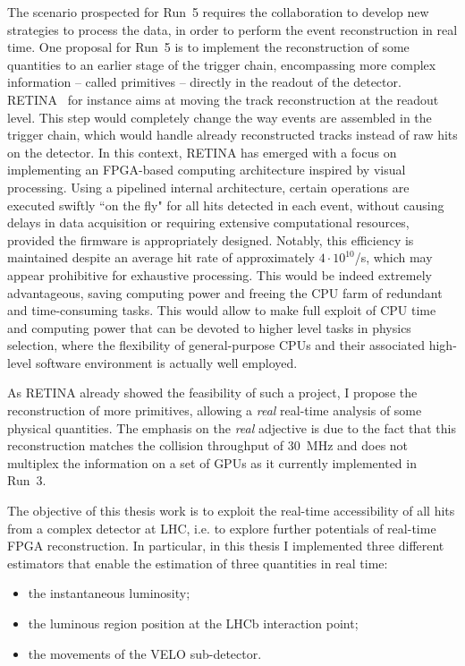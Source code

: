 The scenario prospected for Run~5 requires the collaboration to develop new strategies to process the data, in order to perform the event reconstruction in real time. One proposal for Run~5 is to implement the reconstruction of some quantities to an earlier stage of the trigger chain, encompassing  more complex information -- called primitives -- directly in the readout of the detector. RETINA~\cite{refId0} for instance aims at moving the track reconstruction at the readout level. This step would completely change the way events are assembled in the trigger chain, which would handle already reconstructed tracks instead of raw hits on the detector. In this context, RETINA has emerged with a focus on implementing an FPGA-based computing architecture inspired by visual processing. Using a pipelined internal architecture, certain operations are executed swiftly ``on the fly" for all hits detected in each event, without causing delays in data acquisition or requiring extensive computational resources, provided the firmware is appropriately designed. Notably, this efficiency is maintained despite an average hit rate of approximately $4 \cdot 10^{10}$/s, which may appear prohibitive for exhaustive processing.
This would be indeed extremely advantageous, saving computing power and freeing the CPU farm of redundant and time-consuming tasks. This would allow to make full exploit of CPU time and computing power that can be devoted to higher level tasks in physics selection, where the flexibility of general-purpose CPUs and their associated high-level software environment is actually well employed.

As RETINA already showed the feasibility of such a project, I propose the reconstruction of more primitives, allowing a \textit{real} real-time analysis of some physical quantities. The emphasis on the \textit{real} adjective is due to the fact that this reconstruction matches the collision throughput of \SI{30}{\mega\hertz} and does not multiplex the information on a set of GPUs as it currently implemented in Run~3.

The objective of this thesis work is to exploit the real-time accessibility of all hits from a complex detector at LHC, i.e. to explore further potentials of real-time FPGA reconstruction. In particular, in this thesis I implemented three different estimators that enable the estimation of three quantities in real time:
\begin{itemize}
\item the instantaneous luminosity;
\item the luminous region position at the LHCb interaction point;
\item the movements of the VELO sub-detector.
\end{itemize}

